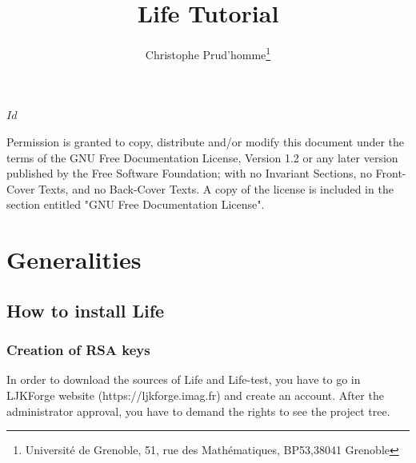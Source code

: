 \documentclass[11pt]{article}
\title{Life Tutorial}
\author{Christophe Prud'homme\thanks{Université de Grenoble,
51, rue des Mathématiques, BP53,38041 Grenoble}}
\date{\svnToday}
\begin{document}
\thispagestyle{empty}
\svnInfo $Id$





\maketitle

\newpage

\thispagestyle{empty}


\vfill
Permission is granted to copy, distribute and/or modify this document
under the terms of the GNU Free Documentation License, Version 1.2
or any later version published by the Free Software Foundation;
with no Invariant Sections, no Front-Cover Texts, and no Back-Cover Texts.
A copy of the license is included in the section entitled "GNU
Free Documentation License".

\newpage

\tableofcontents


\section{Generalities}

\subsection{How to install Life}

\subsubsection{Creation of RSA keys}
In order to download the sources of Life and Life-test, you have to go in
LJKForge website (https://ljkforge.imag.fr) and create an account. After the
administrator approval, you have to demand the rights to see the project tree.
\end{document}
